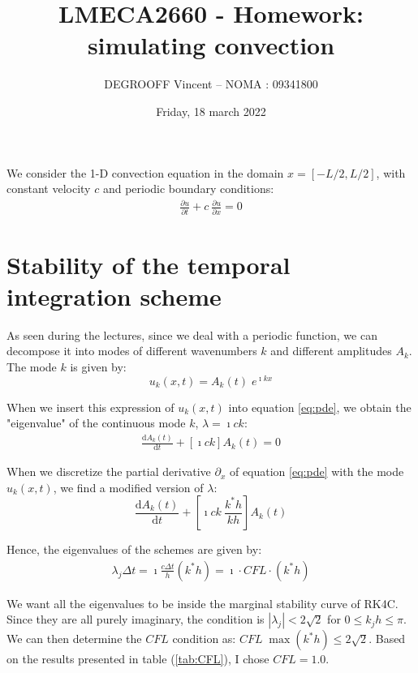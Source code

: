 \documentclass[11 pt]{article}
\title{LMECA2660 - Homework: simulating convection}
\author{DEGROOFF Vincent \quad -- \quad NOMA : 09341800}
\date{Friday, 18 march 2022}
\begin{document}
\maketitle

We consider the 1-D convection equation in the domain $x=[-L/2,L/2]$, with constant velocity $c$ and periodic boundary conditions:
\begin{align}
    \frac{\partial u}{\partial t} + c\: \frac{\partial u}{\partial x} = 0 \label{eq:pde}
\end{align}

\section{Stability of the temporal integration scheme}
As seen during the lectures, since we deal with a periodic function, we can decompose it into modes of different wavenumbers $k$ and different amplitudes $A_k$. The mode $k$ is given by:
\[u_k(x,t) = A_k(t) \; e^{\imath k x}\]

When we insert this expression of $u_k(x,t)$ into equation \eqref{eq:pde}, we obtain the "eigenvalue" of the continuous mode $k$, $\lambda = \imath c k$:
\begin{align*}
    \frac{\mathrm{d}A_k(t)}{\mathrm{d}t} + \left[\imath c k\right] A_k(t) = 0
\end{align*}

When we discretize the partial derivative $\partial_x$ of equation \eqref{eq:pde} with the mode $u_k(x,t)$, we find a modified version of $\lambda$:
\[\frac{\mathrm{d}A_k(t)}{\mathrm{d}t} + \left[\imath c k \:\frac{k^* h}{kh}\right] A_k(t)\]

Hence, the eigenvalues of the schemes are given by:
\begin{align*}
    \lambda_j \Delta t = \imath \frac{c\Delta t}{h} (k^* h) = \imath \cdot CFL \cdot (k^*h)
\end{align*}

We want all the eigenvalues to be inside the marginal stability curve of RK4C. Since they are all purely imaginary, the condition is $|\lambda_j|<2\sqrt{2}$ for $0\leq k_j h \leq \pi$. We can then determine the $CFL$ condition as: $CFL \; \max{(k^* h)} \leq 2\sqrt{2}$. Based on the results presented in table (\ref{tab:CFL}), I chose $CFL=1.0$.
\end{document}
